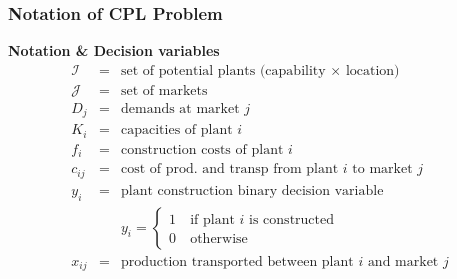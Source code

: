 \documentclass[10pt,handout,notes=show]{beamer}
\begin{document}
\begin{frame}
  \frametitle{Notation of CPL  Problem }

  \textbf{Notation \& Decision variables}
  \begin{eqnarray*}
    \mathcal{I} &=& \mbox{set of potential plants (capability $\times$ location)}\\
    \mathcal{J} &=& \mbox{set of markets}\\
    D_j         &=& \mbox{demands at market $j$}\\
    K_i         &=& \mbox{capacities of plant $i$}\\
    f_i         &=& \mbox{construction costs of plant $i$}\\
    c_{ij}      &=& \mbox{cost of prod. and transp from plant $i$ to market $j$}\\
    y_{i}       &=& \mbox{plant construction binary decision variable}\\
                & & y_i = \begin{cases}
                          1~& \mbox{if plant $i$ is constructed}\\
                          0~& \mbox{otherwise}
                          \end{cases} \\
    x_{ij}      &=& \mbox{production transported between plant $i$ and market $j$} \\
  \end{eqnarray*}

\end{frame}
\end{document}
